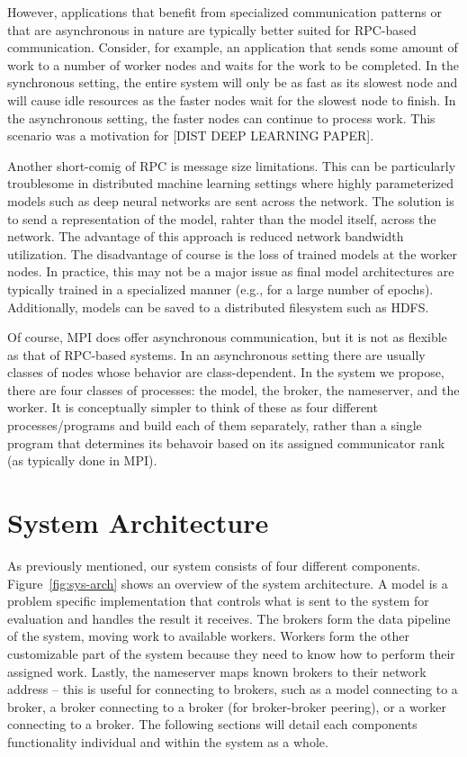 \documentclass[conference]{IEEEtran}
\begin{document}
However, applications that benefit from specialized communication patterns or
that are asynchronous in nature are typically better suited for RPC-based
communication. Consider, for example, an application that sends some amount of
work to a number of worker nodes and waits for the work to be completed. In the
synchronous setting, the entire system will only be as fast as its slowest node
and will cause idle resources as the faster nodes wait for the slowest node to
finish. In the asynchronous setting, the faster nodes can continue to process
work. This scenario was a motivation for [DIST DEEP LEARNING PAPER].

Another short-comig of RPC is message size limitations. This can be particularly
troublesome in distributed machine learning settings where highly parameterized
models such as deep neural networks are sent across the network. The solution
is to send a representation of the model, rahter than the model itself, across
the network. The advantage of this approach is reduced network bandwidth
utilization. The disadvantage of course is the loss of trained models at the
worker nodes. In practice, this may not be a major issue as final model
architectures are typically trained in a specialized manner (e.g., for a large
number of epochs). Additionally, models can be saved to a distributed filesystem
such as HDFS.

Of course,
MPI does offer asynchronous communication, but it is not as flexible as that of
RPC-based systems. In an asynchronous setting there are usually classes of nodes
whose behavior are class-dependent. In the system we propose, there are four
classes of processes: the model, the broker, the nameserver, and the worker. It
is conceptually simpler to think of these as four different processes/programs
and build each of them separately, rather than a single program that determines
its behavoir based on its assigned communicator rank (as typically done in MPI).


\section{System Architecture}
As previously mentioned, our system consists of four different components.
Figure~\ref{fig:sys-arch} shows an overview of the system architecture.
A model
is a problem specific implementation that controls what is sent to the system for
evaluation and handles the result it receives. The brokers form the data pipeline
of the system, moving work to available workers. Workers form the other customizable
part of the system because they need to know how to perform their assigned work.
Lastly, the nameserver maps known brokers to their network address -- this is useful
for connecting to brokers, such as a model connecting to a broker, a broker connecting
to a broker (for broker-broker peering), or a worker connecting to a broker. The
following sections will detail each components functionality individual and within
the system as a whole.
\end{document}
